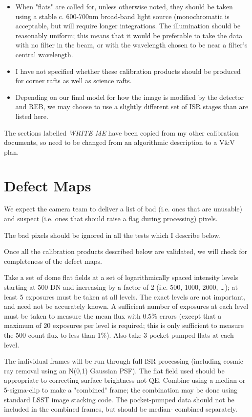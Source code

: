 \documentclass[DM,authoryear,toc,lsstdraft]{lsstdoc}
\begin{document}
\begin{itemize}
\item When "flats" are called for, unless otherwise noted, they should be taken using a stable c. 600-700nm
broad-band light source (monochromatic is acceptable, but will require longer integrations. The illumination
should be reasonably uniform; this means that it would be preferable to take the data with no filter in the
beam, or with the wavelength chosen to be near a filter's central wavelength.

\item I have not specified whether these calibration products should be produced for corner rafts as well as science rafts.

\item Depending on our final model for how the image is modified by the detector and REB, we may choose to use a
slightly different set of ISR stages than are listed here.
\end{itemize}

The sections labelled \emph{WRITE ME} have been copied from my other calibration documents, so need to
be changed from an algorithmic description to a V\&V plan.

\section{Defect Maps}

We expect the camera team to deliver a list of bad (i.e. ones that are unusable) and suspect (i.e.
ones that should raise a flag during processing) pixels.

The bad pixels should be ignored in all the tests which I describe below.

Once all the calibration products described below are validated, we will check for completeness of
the defect maps.

Take a set of dome flat fields at a set of logarithmically spaced intensity
levels starting at 500 DN and increasing by a factor of 2 (i.e. 500, 1000, 2000, \ldots{}); at least 5 exposures
must be taken at all levels.  The exact levels are not important, and need not be accurately known.  A
sufficient number of exposures at each level must be taken to measure the mean flux with 0.5\% errors (except
that a maximum of 20 exposures per level is required; this is only sufficient to measure the 500-count flux to
less than 1\%).  Also take 3 pocket-pumped flats at each level.

The individual frames will be run through full ISR processing (including cosmic ray removal using an N(0,1)
Gaussian PSF).  The flat field used should be appropriate to correcting surface brightness not QE. Combine
using a median or 5-sigma-clip to make a "combined" frame; the combination may be done using standard LSST image
stacking code.  The pocket-pumped data should not be included in the combined frames, but should be median-
combined separately.
\end{document}
